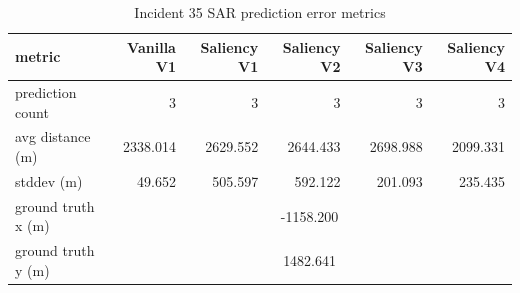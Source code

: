 \begin{table}[ht]
\centering
\caption{Incident 35 SAR prediction error metrics}
\label{tab:sar-incident-35}
\begin{tabular}{lrrrrr}
\hline
metric & Vanilla V1 & Saliency V1 & Saliency V2 & Saliency V3 & Saliency V4 \\
\hline
prediction count & 3 & 3 & 3 & 3 & 3 \\
avg distance (m) & 2338.014 & 2629.552 & 2644.433 & 2698.988 & 2099.331 \\
stddev (m) & 49.652 & 505.597 & 592.122 & 201.093 & 235.435 \\
ground truth x (m) & \multicolumn{5}{c}{-1158.200} \\
ground truth y (m) & \multicolumn{5}{c}{1482.641} \\
\hline
\end{tabular}
\end{table}
